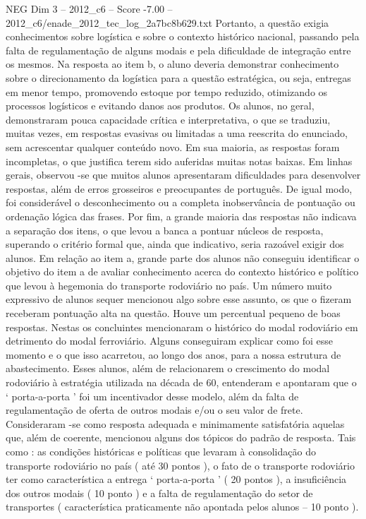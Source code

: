 \begin{textsample}{NEG Dim 3 – 2012\_c6 – Score -7.00 – 2012\_c6/enade\_2012\_tec\_log\_2a7bc8b629.txt}
Portanto, a questão exigia conhecimentos sobre logística e sobre o contexto histórico nacional, passando pela falta de regulamentação de alguns modais e pela dificuldade de integração entre os mesmos.
Na resposta ao item b, o aluno deveria demonstrar conhecimento sobre o direcionamento da logística para a questão estratégica, ou seja, entregas em menor tempo, promovendo estoque por tempo reduzido, otimizando os processos logísticos e evitando danos aos produtos.
Os alunos, no geral, demonstraram pouca capacidade crítica e interpretativa, o que se traduziu, muitas vezes, em respostas evasivas ou limitadas a uma reescrita do enunciado, sem acrescentar qualquer conteúdo novo.
Em sua maioria, as respostas foram incompletas, o que justifica terem sido auferidas muitas notas baixas.
Em linhas gerais, observou -se que muitos alunos apresentaram dificuldades para desenvolver respostas, além de erros grosseiros e preocupantes de português.
De igual modo, foi considerável o desconhecimento ou a completa inobservância de pontuação ou ordenação lógica das frases.
Por fim, a grande maioria das respostas não indicava a separação dos itens, o que levou a banca a pontuar núcleos de resposta, superando o critério formal que, ainda que indicativo, seria razoável exigir dos alunos.
Em relação ao item a, grande parte dos alunos não conseguiu identificar o objetivo do item a de avaliar conhecimento acerca do contexto histórico e político que levou à hegemonia do transporte rodoviário no país.
Um número muito expressivo de alunos sequer mencionou algo sobre esse assunto, os que o fizeram receberam pontuação alta na questão.
Houve um percentual pequeno de boas respostas.
Nestas os concluintes mencionaram o histórico do modal rodoviário em detrimento do modal ferroviário.
Alguns conseguiram explicar como foi esse momento e o que isso acarretou, ao longo dos anos, para a nossa estrutura de abastecimento.
Esses alunos, além de relacionarem o crescimento do modal rodoviário à estratégia utilizada na década de 60, entenderam e apontaram que o ‘ porta-a-porta ’ foi um incentivador desse modelo, além da falta de regulamentação de oferta de outros modais e/ou o seu valor de frete.
Consideraram -se como resposta adequada e minimamente satisfatória aquelas que, além de coerente, mencionou alguns dos tópicos do padrão de resposta.
Tais como : as condições históricas e políticas que levaram à consolidação do transporte rodoviário no país ( até 30 pontos ), o fato de o transporte rodoviário ter como característica a entrega ‘ porta-a-porta ’ ( 20 pontos ), a insuficiência dos outros modais ( 10 ponto ) e a falta de regulamentação do setor de transportes ( característica praticamente não apontada pelos alunos – 10 ponto ).

\end{textsample}
